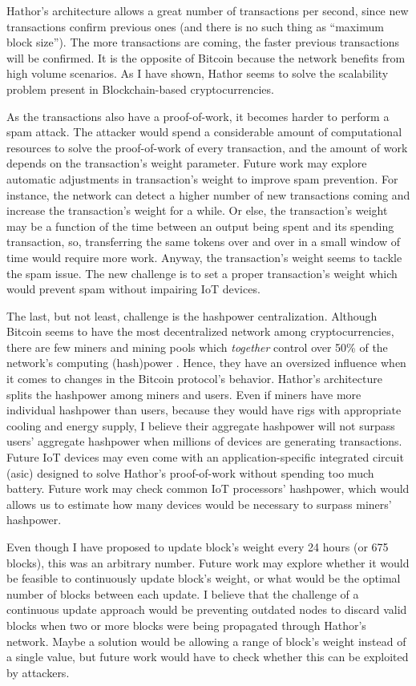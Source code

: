 Hathor's architecture allows a great number of transactions per second, since new transactions confirm previous ones (and there is no such thing as ``maximum block size''). The more transactions are coming, the faster previous transactions will be confirmed. It is the opposite of Bitcoin because the network benefits from high volume scenarios. As I have shown, Hathor seems to solve the scalability problem present in Blockchain-based cryptocurrencies.

As the transactions also have a proof-of-work, it becomes harder to perform a spam attack. The attacker would spend a considerable amount of computational resources to solve the proof-of-work of every transaction, and the amount of work depends on the transaction's weight parameter. Future work may explore automatic adjustments in transaction's weight to improve spam prevention. For instance, the network can detect a higher number of new transactions coming and increase the transaction's weight for a while. Or else, the transaction's weight may be a function of the time between an output being spent and its spending transaction, so, transferring the same tokens over and over in a small window of time would require more work. Anyway, the transaction's weight seems to tackle the spam issue. The new challenge is to set a proper transaction's weight which would prevent spam without impairing IoT devices.

The last, but not least, challenge is the hashpower centralization. Although Bitcoin seems to have the most decentralized network among cryptocurrencies, there are few miners and mining pools which \emph{together} control over 50\% of the network’s computing (hash)power \citep{gencer2018decentralization}. Hence, they have an oversized influence when it comes to changes in the Bitcoin protocol's behavior. Hathor's architecture splits the hashpower among miners and users. Even if miners have more individual hashpower than users, because they would have rigs with appropriate cooling and energy supply, I believe their aggregate hashpower will not surpass users' aggregate hashpower when millions of devices are generating transactions. Future IoT devices may even come with an application-specific integrated circuit (asic) designed to solve Hathor's proof-of-work without spending too much battery. Future work may check common IoT processors' hashpower, which would allows us to estimate how many devices would be necessary to surpass miners' hashpower.

Even though I have proposed to update block's weight every 24 hours (or 675 blocks), this was an arbitrary number. Future work may explore whether it would be feasible to continuously update block's weight, or what would be the optimal number of blocks between each update. I believe that the challenge of a continuous update approach would be preventing outdated nodes to discard valid blocks when two or more blocks were being propagated through Hathor's network. Maybe a solution would be allowing a range of block's weight instead of a single value, but future work would have to check whether this can be exploited by attackers.

